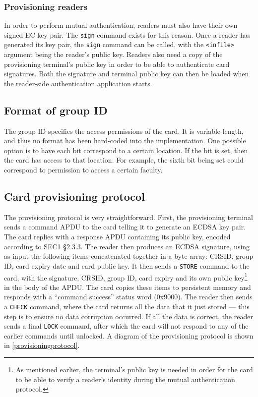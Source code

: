 \documentclass[12pt,a4paper,twoside,openright]{report}
\begin{document}
\subsubsection{Provisioning readers}

In order to perform mutual authentication, readers must also have their own signed EC key pair. The \texttt{sign} command exists for this reason. Once a reader has generated its key pair, the \texttt{sign} command can be called, with the \texttt{<infile>} argument being the reader's public key. Readers also need a copy of the provisioning terminal's public key in order to be able to authenticate card signatures. Both the signature and terminal public key can then be loaded when the reader-side authentication application starts.

\subsection{Format of group ID}

The group ID specifies the access permissions of the card. It is variable-length, and thus no format has been hard-coded into the implementation. One possible option is to have each bit correspond to a certain location. If the bit is set, then the card has access to that location. For example, the sixth bit being set could correspond to permission to access a certain faculty.

\subsection{Card provisioning protocol}

The provisioning protocol is very straightforward. First, the provisioning terminal sends a command APDU to the card telling it to generate an ECDSA key pair. The card replies with a response APDU containing its public key, encoded according to SEC1 \cite{sec1} \S2.3.3. The reader then produces an ECDSA signature, using as input the following items concatenated together in a byte array: CRSID, group ID, card expiry date and card public key. It then sends a \texttt{STORE} command to the card, with the signature, CRSID, group ID, card expiry and its own public key\footnote{As mentioned earlier, the terminal's public key is needed in order for the card to be able to verify a reader's identity during the mutual authentication protocol.} in the body of the APDU. The card copies these items to persistent memory and responds with a ``command success'' status word (0x9000). The reader then sends a \texttt{CHECK} command, where the card returns all the data that it just stored --- this step is to ensure no data corruption occurred. If all the data is correct, the reader sends a final \texttt{LOCK} command, after which the card will not respond to any of the earlier commands until unlocked. A diagram of the provisioning protocol is shown in \autoref{provisioningprotocol}.
\end{document}
